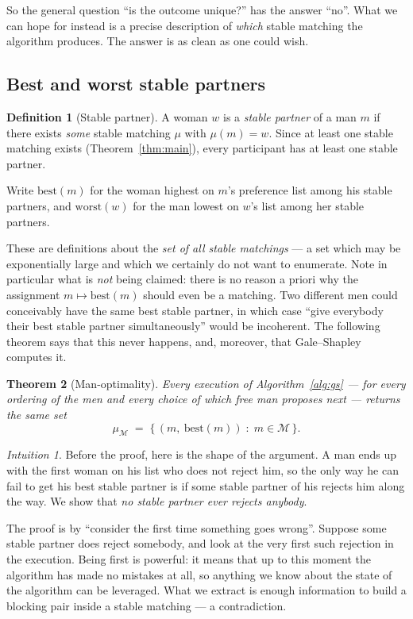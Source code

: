 \documentclass[11pt,a4paper]{article}
\theoremstyle{plain}
\newtheorem{theorem}{Theorem}[section]
\theoremstyle{definition}
\newtheorem{definition}[theorem]{Definition}
\theoremstyle{remark}
\newtheorem*{intuition}{Intuition}
\newcommand{\Men}{\mathcal{M}}
\begin{document}
So the general question ``is the outcome unique?'' has the answer ``no''. What
we can hope for instead is a precise description of \emph{which} stable
matching the algorithm produces. The answer is as clean as one could wish.

\subsection{Best and worst stable partners}

\begin{definition}[Stable partner]
A woman $w$ is a \emph{stable partner} of a man $m$ if there exists \emph{some}
stable matching $\mu$ with $\mu(m) = w$. Since at least one stable matching
exists (Theorem~\ref{thm:main}), every participant has at least one stable
partner.

Write $\mathrm{best}(m)$ for the woman highest on $m$'s preference list among
his stable partners, and $\mathrm{worst}(w)$ for the man lowest on $w$'s list
among her stable partners.
\end{definition}

These are definitions about the \emph{set of all stable matchings} --- a set
which may be exponentially large and which we certainly do not want to
enumerate. Note in particular what is \emph{not} being claimed: there is no
reason a priori why the assignment $m \mapsto \mathrm{best}(m)$ should even be
a matching. Two different men could conceivably have the same best stable
partner, in which case ``give everybody their best stable partner
simultaneously'' would be incoherent. The following theorem says that this
never happens, and, moreover, that Gale--Shapley computes it.

\begin{theorem}[Man-optimality]\label{thm:manoptimal}
Every execution of Algorithm~\ref{alg:gs} --- for every ordering of the men
and every choice of which free man proposes next --- returns the same set
\[
  \mu_{\Men} \;=\; \bigl\{\,(m,\ \mathrm{best}(m)) \;:\; m \in \Men \,\bigr\}.
\]
\end{theorem}

\begin{intuition}
Before the proof, here is the shape of the argument. A man ends up with the
first woman on his list who does not reject him, so the only way he can fail
to get his best stable partner is if some stable partner of his rejects him
along the way. We show that \emph{no stable partner ever rejects anybody}.

The proof is by ``consider the first time something goes wrong''. Suppose some
stable partner does reject somebody, and look at the very first such rejection
in the execution. Being first is powerful: it means that up to this moment the
algorithm has made no mistakes at all, so anything we know about the state of
the algorithm can be leveraged. What we extract is enough information to build
a blocking pair inside a stable matching --- a contradiction.
\end{intuition}
\end{document}
